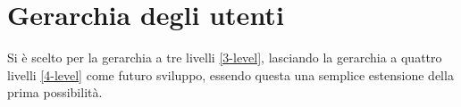 \section{Gerarchia degli utenti}
Si è scelto per la gerarchia a tre livelli \ref{3-level}, lasciando la gerarchia a quattro livelli \ref{4-level} come futuro sviluppo, essendo questa una semplice estensione della prima possibilità.